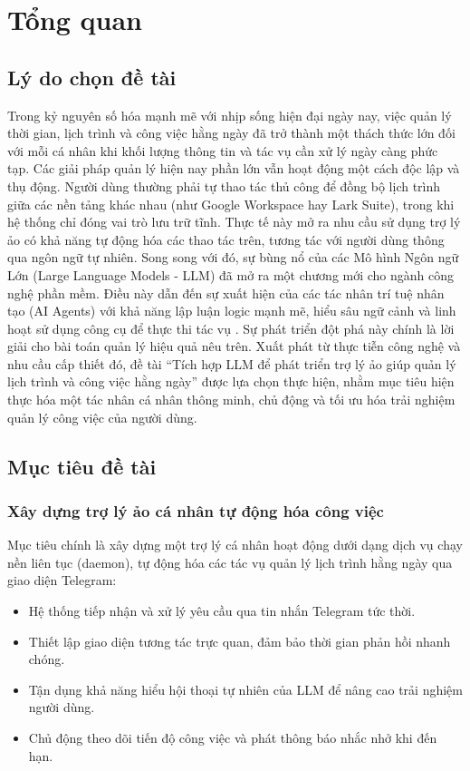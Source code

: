 \chapter{Tổng quan}
\label{chap:overview}

\section{Lý do chọn đề tài}
Trong kỷ nguyên số hóa mạnh mẽ với nhịp sống hiện đại ngày nay, việc quản lý thời gian, lịch trình và công việc hằng ngày đã trở thành một thách thức lớn đối với mỗi cá nhân khi khối lượng thông tin và tác vụ cần xử lý ngày càng phức tạp. Các giải pháp quản lý hiện nay phần lớn vẫn hoạt động một cách độc lập và thụ động. Người dùng thường phải tự thao tác thủ công để đồng bộ lịch trình giữa các nền tảng khác nhau (như Google Workspace hay Lark Suite), trong khi hệ thống chỉ đóng vai trò lưu trữ tĩnh. Thực tế này mở ra nhu cầu sử dụng trợ lý ảo có khả năng tự động hóa các thao tác trên, tương tác với người dùng thông qua ngôn ngữ tự nhiên. Song song với đó, sự bùng nổ của các Mô hình Ngôn ngữ Lớn (Large Language Models - LLM) đã mở ra một chương mới cho ngành công nghệ phần mềm. Điều này dẫn đến sự xuất hiện của các tác nhân trí tuệ nhân tạo (AI Agents) với khả năng lập luận logic mạnh mẽ, hiểu sâu ngữ cảnh và linh hoạt sử dụng công cụ để thực thi tác vụ \cite{wang2023surveyagents}. Sự phát triển đột phá này chính là lời giải cho bài toán quản lý hiệu quả nêu trên. Xuất phát từ thực tiễn công nghệ và nhu cầu cấp thiết đó, đề tài “Tích hợp LLM để phát triển trợ lý ảo giúp quản lý lịch trình và công việc hằng ngày” được lựa chọn thực hiện, nhằm mục tiêu hiện thực hóa một tác nhân cá nhân thông minh, chủ động và tối ưu hóa trải nghiệm quản lý công việc của người dùng.

\section{Mục tiêu đề tài}

\subsection{Xây dựng trợ lý ảo cá nhân tự động hóa công việc}
Mục tiêu chính là xây dựng một trợ lý cá nhân hoạt động dưới dạng dịch vụ chạy nền liên tục (daemon), tự động hóa các tác vụ quản lý lịch trình hằng ngày qua giao diện Telegram:
\begin{itemize}
  \item Hệ thống tiếp nhận và xử lý yêu cầu qua tin nhắn Telegram tức thời.
  \item Thiết lập giao diện tương tác trực quan, đảm bảo thời gian phản hồi nhanh chóng.
  \item Tận dụng khả năng hiểu hội thoại tự nhiên của LLM để nâng cao trải nghiệm người dùng.
  \item Chủ động theo dõi tiến độ công việc và phát thông báo nhắc nhở khi đến hạn.
\end{itemize}

